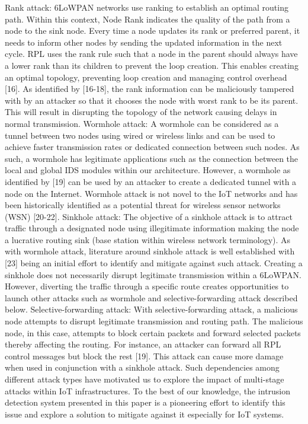 \documentclass[letterpaper, 10 pt, conference]{ieeeconf}  %
\begin{document}
Rank attack: 6LoWPAN networks use ranking to establish an optimal routing path. Within this context, Node Rank indicates the quality of the path from a node to the sink node. Every time a node updates its rank or preferred parent, it needs to inform other nodes by sending the updated information in the next cycle. RPL uses the rank rule such that a node in the parent should always have a lower rank than its children to prevent the loop creation. This enables creating an optimal topology, preventing loop creation and managing control overhead [16]. As identified by [16-18], the rank information can be maliciously tampered with by an attacker so that it chooses the node with worst rank to be its parent. This will result in disrupting the topology of the network causing delays in normal transmission.\cite{c8}
Wormhole attack: A wormhole can be considered as a tunnel between two nodes using wired or wireless links and can be used to achieve faster transmission rates or dedicated connection between such nodes. As such, a wormhole has legitimate applications such as the connection between the local and global IDS modules within our architecture. However, a wormhole as identified by [19] can be used by an attacker to create a dedicated tunnel with a node on the Internet. Wormhole attack is not novel to the IoT networks and has been historically identified as a potential threat for wireless sensor networks (WSN) [20-22].
Sinkhole attack: The objective of a sinkhole attack is to attract traffic through a designated node using illegitimate information making the node a lucrative routing sink (base station within wireless network terminology). As with wormhole attack, literature around sinkhole attack is well established with [23] being an initial effort to identify and mitigate against such attack. Creating a sinkhole does not necessarily disrupt legitimate transmission within a 6LoWPAN. However, diverting the traffic through a specific route creates opportunities to launch other attacks such as wormhole and selective-forwarding attack described below.
Selective-forwarding attack: With selective-forwarding attack, a malicious node attempts to disrupt legitimate transmission and routing path. The malicious node, in this case, attempts to block certain packets and forward selected packets thereby affecting the routing. For instance, an attacker can forward all RPL control messages but block the rest [19]. This attack can cause more damage when used in conjunction with a sinkhole attack. Such dependencies among different attack types have motivated us to explore the impact of multi-stage attacks within IoT infrastructures. To the best of our knowledge, the intrusion detection system presented in this paper is a pioneering effort to identify this issue and explore a solution to mitigate against it especially for IoT systems.
\end{document}
